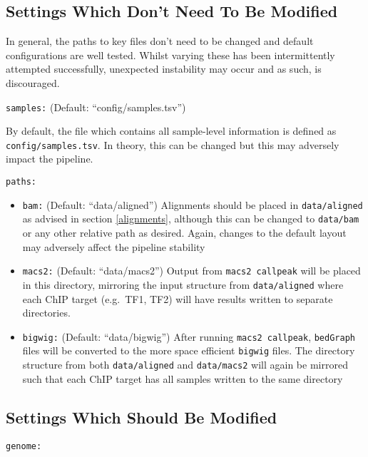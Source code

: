 \documentclass[
]{book}
\providecommand{\tightlist}{%
  \setlength{\itemsep}{0pt}\setlength{\parskip}{0pt}}
\begin{document}
\hypertarget{settings-which-dont-need-to-be-modified}{%
\subsection{Settings Which Don't Need To Be Modified}\label{settings-which-dont-need-to-be-modified}}

In general, the paths to key files don't need to be changed and default configurations are well tested.
Whilst varying these has been intermittently attempted successfully, unexpected instability may occur and as such, is discouraged.

\texttt{samples:} (Default: ``config/samples.tsv'')

By default, the file which contains all sample-level information is defined as \texttt{config/samples.tsv}.
In theory, this can be changed but this may adversely impact the pipeline.

\texttt{paths:}

\begin{itemize}
\tightlist
\item
  \texttt{bam:} (Default: ``data/aligned'') Alignments should be placed in \texttt{data/aligned} as advised in section \ref{alignments}, although this can be changed to \texttt{data/bam} or any other relative path as desired. Again, changes to the default layout may adversely affect the pipeline stability
\item
  \texttt{macs2:} (Default: ``data/macs2'') Output from \texttt{macs2\ callpeak} will be placed in this directory, mirroring the input structure from \texttt{data/aligned} where each ChIP target (e.g.~TF1, TF2) will have results written to separate directories.
\item
  \texttt{bigwig:} (Default: ``data/bigwig'') After running \texttt{macs2\ callpeak}, \texttt{bedGraph} files will be converted to the more space efficient \texttt{bigwig} files. The directory structure from both \texttt{data/aligned} and \texttt{data/macs2} will again be mirrored such that each ChIP target has all samples written to the same directory
\end{itemize}

\hypertarget{settings-which-should-be-modified}{%
\subsection{Settings Which Should Be Modified}\label{settings-which-should-be-modified}}

\texttt{genome:}
\end{document}

